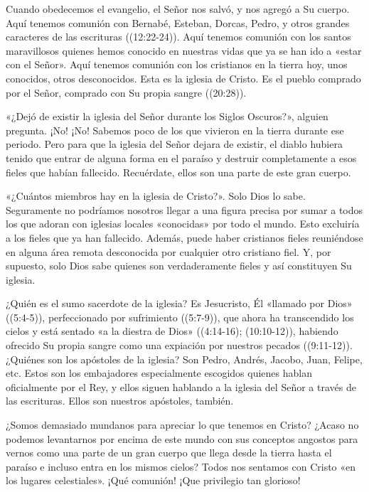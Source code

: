 \documentclass[12pt, twoside, openright]{book}
\begin{document}
Cuando obedecemos el evangelio, el Señor nos salvó, y nos agregó a Su cuerpo. Aquí tenemos comunión con Bernabé, Esteban, Dorcas, Pedro, y otros grandes caracteres de las escrituras ((12:22-24)). Aquí tenemos comunión con los santos maravillosos quienes hemos conocido en nuestras vidas que ya se han ido a «estar con el Señor». Aquí tenemos comunión con los cristianos en la tierra hoy, unos conocidos, otros desconocidos. Esta es la iglesia de Cristo. Es el pueblo comprado por el Señor, comprado con Su propia sangre ((20:28)).

«¿Dejó de existir la iglesia del Señor durante los Siglos Oscuros?», alguien pregunta. ¡No! ¡No! Sabemos poco de los que vivieron en la tierra durante ese periodo. Pero para que la iglesia del Señor dejara de existir, el diablo hubiera tenido que entrar de alguna forma en el paraíso y destruir completamente a esos fieles que habían fallecido. Recuérdate, ellos son una parte de este gran cuerpo.

«¿Cuántos miembros hay en la iglesia de Cristo?». Solo Dios lo sabe. Seguramente no podríamos nosotros llegar a una figura precisa por sumar a todos los que adoran con iglesias locales «conocidas» por todo el mundo. Esto excluiría a los fieles que ya han fallecido. Además, puede haber cristianos fieles reuniéndose en alguna área remota desconocida por cualquier otro cristiano fiel. Y, por supuesto, solo Dios sabe quienes son verdaderamente fieles y así constituyen Su iglesia.

¿Quién es el sumo sacerdote de la iglesia? Es Jesucristo, Él «llamado por Dios» ((5:4-5)), perfeccionado por sufrimiento ((5:7-9)), que ahora ha transcendido los cielos y está sentado «a la diestra de Dios» ((4:14-16); (10:10-12)), habiendo ofrecido Su propia sangre como una expiación por nuestros pecados ((9:11-12)). ¿Quiénes son los apóstoles de la iglesia? Son Pedro, Andrés, Jacobo, Juan, Felipe, etc. Estos son los embajadores especialmente escogidos quienes hablan oficialmente por el Rey, y ellos siguen hablando a la iglesia del Señor a través de las escrituras. Ellos son nuestros apóstoles, también.

¿Somos demasiado mundanos para apreciar lo que tenemos en Cristo? ¿Acaso no podemos levantarnos por encima de este mundo con sus conceptos angostos para vernos como una parte de un gran cuerpo que llega desde la tierra hasta el paraíso e incluso entra en los mismos cielos? Todos nos sentamos con Cristo «en los lugares celestiales». ¡Qué comunión! ¡Que privilegio tan glorioso!
\end{document}
